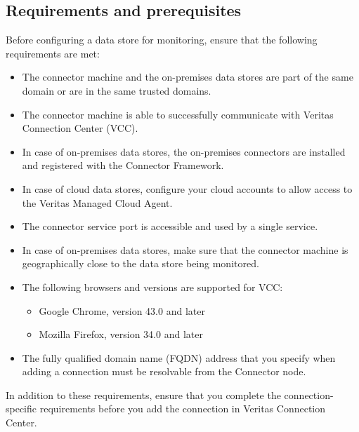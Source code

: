\documentclass[letterpaper,10pt,english]{sphinxmanual}
\begin{document}
\subsection{Requirements and prerequisites}
\label{\detokenize{mcdmp_app_ug:requirements-and-prerequisites}}\label{\detokenize{mcdmp_app_ug:requirements-generic}}
Before configuring a data store for monitoring, ensure that the following requirements are met:
\begin{itemize}
\item {} 
The connector machine and the on-premises data stores are part of the same domain or are in the same trusted domains.

\item {} 
The connector machine is able to successfully communicate with Veritas Connection Center (VCC).

\item {} 
In case of on-premises data stores, the on-premises connectors are installed and registered with the Connector Framework.

\item {} 
In case of cloud data stores, configure your cloud accounts to allow access to the Veritas Managed Cloud Agent.

\item {} 
The connector service port is accessible and used by a single service.

\item {} 
In case of on-premises data stores, make sure that the connector machine is geographically close to the data store being monitored.

\item {} 
The following browsers and versions are supported for VCC:
\begin{itemize}
\item {} 
Google Chrome, version 43.0 and later

\item {} 
Mozilla Firefox, version 34.0 and later

\end{itemize}

\item {} 
The fully qualified domain name (FQDN) address that you specify when adding a connection must be resolvable from the Connector node.

\end{itemize}

In addition to these requirements, ensure that you complete the connection-specific requirements before you add the connection in Veritas Connection Center.
\end{document}
